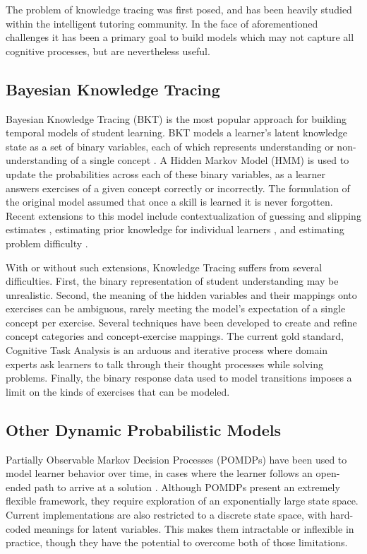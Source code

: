 The problem of knowledge tracing was first posed, and has been heavily studied within the intelligent tutoring community. In the face of aforementioned challenges it has been a primary goal to build models which may not capture all cognitive processes, but are nevertheless useful.

\subsection{Bayesian Knowledge Tracing}

Bayesian Knowledge Tracing (BKT) is the most popular approach for building temporal models of student learning. BKT models a learner's latent knowledge state as a set of binary variables, each of which represents understanding or non-understanding of a single concept \cite{corbett1994knowledge}. A Hidden Markov Model (HMM) is used to update the probabilities across each of these binary variables, as a learner answers exercises of a given concept correctly or incorrectly. The formulation of the original model assumed that once a skill is learned it is never forgotten.  
Recent extensions to this model include contextualization of guessing and slipping estimates \cite{d2008more}, estimating prior knowledge for individual learners \cite{yudelson2013individualized}, and estimating problem difficulty \cite{pardos2011kt}.

With or without such extensions, Knowledge Tracing suffers from several difficulties. First, the binary representation of student understanding may be unrealistic. Second, the meaning of the hidden variables and their mappings onto exercises can be ambiguous, rarely meeting the model's expectation of a single concept per exercise.
Several techniques have been developed to create and refine concept categories and concept-exercise mappings. The current gold standard, Cognitive Task Analysis \cite{schraagen2000cognitive} is an arduous and iterative process where domain experts ask learners to talk through their thought processes while solving problems.
Finally, the binary response data used to model transitions imposes a limit on the kinds of exercises that can be modeled.

\subsection{Other Dynamic Probabilistic Models}

Partially Observable Markov Decision Processes (POMDPs) have been used to model learner behavior over time, in cases where the learner follows an open-ended path to arrive at a solution \cite{rafferty2011faster}. Although POMDPs present an extremely flexible framework, they require exploration of an exponentially large state space. Current implementations are also restricted to a discrete state space, with hard-coded meanings for latent variables. This makes them intractable or inflexible in practice, though they have the potential to overcome both of those limitations.

